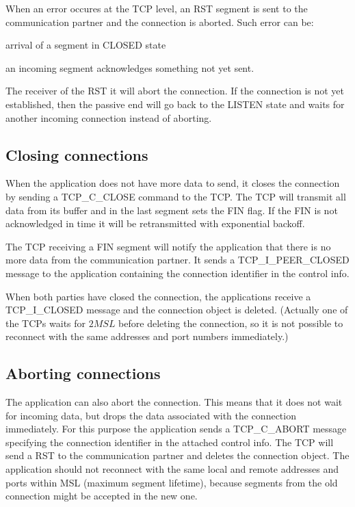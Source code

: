 When an error occures at the TCP level, an RST segment is sent to
the communication partner and the connection is aborted.
Such error can be:
\begin{compactitem}
  \item arrival of a segment in CLOSED state
  \item an incoming segment acknowledges something not yet sent.
\end{compactitem}

The receiver of the RST it will abort the connection.
If the connection is not yet established, then the passive
end will go back to the LISTEN state and waits for another
incoming connection instead of aborting.    

\subsection{Closing connections}

When the application does not have more data to send, it closes the
connection by sending a TCP\_C\_CLOSE command to the TCP. The TCP
will transmit all data from its buffer and in the last segment sets
the FIN flag. If the FIN is not acknowledged in time it will be
retransmitted with exponential backoff.

The TCP receiving a FIN segment will notify the application that
there is no more data from the communication partner. It sends
a TCP\_I\_PEER\_CLOSED message to the application containing
the connection identifier in the control info.

When both parties have closed the connection, the applications
receive a TCP\_I\_CLOSED message and the connection object is
deleted. (Actually one of the TCPs waits for $2 MSL$ before
deleting the connection, so it is not possible to reconnect
with the same addresses and port numbers immediately.)

\subsection{Aborting connections}

The application can also abort the connection. This means that
it does not wait for incoming data, but drops the data associated
with the connection immediately. For this purpose the application
sends a TCP\_C\_ABORT message specifying the connection identifier
in the attached control info. The TCP will send a RST to the
communication partner and deletes the connection object. The application
should not reconnect with the same local and remote addresses and
ports within MSL (maximum segment lifetime), because segments
from the old connection might be accepted in the new one.

